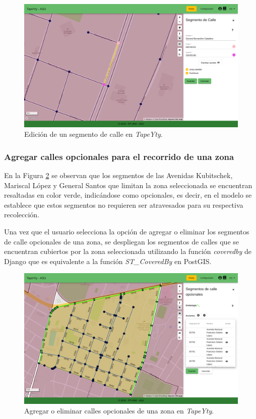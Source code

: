 \begin{figure}[H]
\centerline{\includegraphics[width=\textwidth]{edicionCalle.png}}
\caption{Edición de un segmento de calle en \textit{TapeYty}.}
\label{fig:edicionCalles}
\end{figure}

\subsubsection{Agregar calles opcionales para el recorrido de una zona}

En la Figura \ref{fig:callesOpcionales} se observan que los segmentos de las Avenidas Kubitschek, Mariscal López y General Santos que limitan la zona seleccionada se encuentran resaltadas en color verde, indicándose como opcionales, es decir, en el modelo se establece que estos segmentos no requieren ser atravesados para su respectiva recolección.

Una vez que el usuario selecciona la opción de agregar o eliminar los segmentos de calle opcionales de una zona, se despliegan los segmentos de calles que se encuentran cubiertos por la zona seleccionada utilizando la función \textit{coveredby} de Django que es equivalente a la función \textit{ST\_CoveredBy} en PostGIS.

\begin{figure}[H]
\centerline{\includegraphics[width=\textwidth]{callesOpcionales.png}}
\caption{Agregar o eliminar calles opcionales de una zona en \textit{TapeYty}.}
\label{fig:callesOpcionales}
\end{figure}

